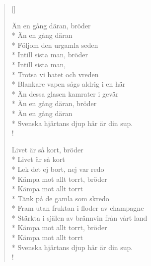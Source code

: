 
\settowidth{\versewidth}{Än dessa glasen kamrater i gevär}



\begin{verse}[\versewidth]


Än en gång däran, bröder\\*
Än en gång däran\\*
Följom den urgamla seden\\*
Intill sista man, bröder\\*
Intill sista man,\\*
Trotsa vi hatet och vreden\\*
Blankare vapen sågs aldrig i en här\\*
Än dessa glasen kamrater i gevär\\*
Än en gång däran, bröder\\*
Än en gång däran\\*
Svenska hjärtans djup här är din sup.\\!


Livet är så kort, bröder\\*
Livet är så kort\\*
Lek det ej bort, nej var redo\\*
Kämpa mot allt torrt, bröder\\*
Kämpa mot allt torrt\\*
Tänk på de gamla som skredo\\*
Fram utan fruktan i floder av champagne\\*
Stärkta i själen av brännvin från vårt land\\*
Kämpa mot allt torrt, bröder\\*
Kämpa mot allt torrt\\*
Svenska hjärtans djup här är din sup.\\!




\end{verse}

